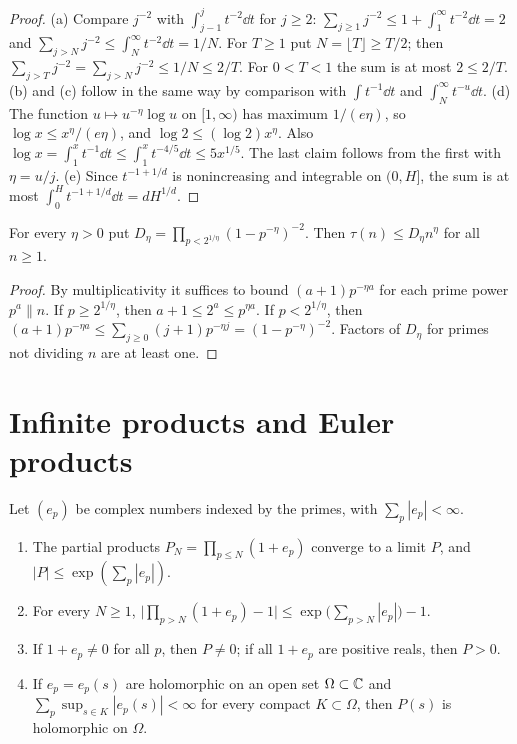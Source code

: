 \begin{proof}
(a) Compare $j^{-2}$ with $\int_{j-1}^jt^{-2}\dd t$ for $j\ge2$: $\sum_{j\ge1}j^{-2}\le1+\int_1^\infty t^{-2}\dd t=2$ and $\sum_{j>N}j^{-2}\le\int_N^\infty t^{-2}\dd t=1/N$. For $T\ge1$ put $N=\lfloor T\rfloor\ge T/2$; then $\sum_{j>T}j^{-2}=\sum_{j>N}j^{-2}\le1/N\le2/T$. For $0<T<1$ the sum is at most $2\le2/T$.
(b) and (c) follow in the same way by comparison with $\int t^{-1}\dd t$ and $\int_N^\infty t^{-u}\dd t$.
(d) The function $u\mapsto u^{-\eta}\log u$ on $[1,\infty)$ has maximum $1/(e\eta)$, so $\log x\le x^\eta/(e\eta)$, and $\log2\le(\log2)x^\eta$. Also $\log x=\int_1^xt^{-1}\dd t\le\int_1^xt^{-4/5}\dd t\le5x^{1/5}$. The last claim follows from the first with $\eta=u/j$.
(e) Since $t^{-1+1/d}$ is nonincreasing and integrable on $(0,H]$, the sum is at most $\int_0^Ht^{-1+1/d}\dd t=dH^{1/d}$.
\end{proof}

\begin{lemma}\label{lem:divisor}
For every $\eta>0$ put $D_\eta=\prod_{p<2^{1/\eta}}(1-p^{-\eta})^{-2}$. Then $\tau(n)\le D_\eta n^\eta$ for all $n\ge1$.
\end{lemma}

\begin{proof}
By multiplicativity it suffices to bound $(a+1)p^{-\eta a}$ for each prime power $p^a\parallel n$. If $p\ge2^{1/\eta}$, then $a+1\le2^a\le p^{\eta a}$. If $p<2^{1/\eta}$, then $(a+1)p^{-\eta a}\le\sum_{j\ge0}(j+1)p^{-\eta j}=(1-p^{-\eta})^{-2}$. Factors of $D_\eta$ for primes not dividing $n$ are at least one.
\end{proof}

\section{Infinite products and Euler products}

\begin{lemma}\label{lem:products}
Let $(e_p)$ be complex numbers indexed by the primes, with $\sum_p|e_p|<\infty$.
\begin{enumerate}[label=(\alph*)]
\item The partial products $P_N=\prod_{p\le N}(1+e_p)$ converge to a limit $P$, and $|P|\le\exp(\sum_p|e_p|)$.
\item For every $N\ge1$, $\bigl|\prod_{p>N}(1+e_p)-1\bigr|\le\exp\bigl(\sum_{p>N}|e_p|\bigr)-1$.
\item If $1+e_p\ne0$ for all $p$, then $P\ne0$; if all $1+e_p$ are positive reals, then $P>0$.
\item If $e_p=e_p(s)$ are holomorphic on an open set $\Omega\subset\mathbb C$ and $\sum_p\sup_{s\in K}|e_p(s)|<\infty$ for every compact $K\subset\Omega$, then $P(s)$ is holomorphic on $\Omega$.
\end{enumerate}
\end{lemma}

